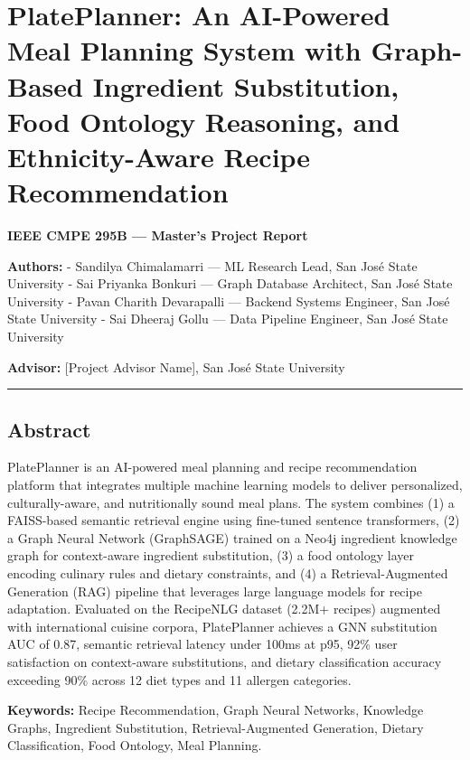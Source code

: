 \documentclass[
  10pt,
]{article}
\author{}
\date{}
\begin{document}
\section{PlatePlanner: An AI-Powered Meal Planning System with
Graph-Based Ingredient Substitution, Food Ontology Reasoning, and
Ethnicity-Aware Recipe
Recommendation}\label{plateplanner-an-ai-powered-meal-planning-system-with-graph-based-ingredient-substitution-food-ontology-reasoning-and-ethnicity-aware-recipe-recommendation}

\textbf{IEEE CMPE 295B --- Master's Project Report}

\textbf{Authors:} - Sandilya Chimalamarri --- ML Research Lead, San José
State University - Sai Priyanka Bonkuri --- Graph Database Architect,
San José State University - Pavan Charith Devarapalli --- Backend
Systems Engineer, San José State University - Sai Dheeraj Gollu --- Data
Pipeline Engineer, San José State University

\textbf{Advisor:} {[}Project Advisor Name{]}, San José State University

\begin{center}\rule{0.5\linewidth}{0.5pt}\end{center}

\subsection{Abstract}\label{abstract}

PlatePlanner is an AI-powered meal planning and recipe recommendation
platform that integrates multiple machine learning models to deliver
personalized, culturally-aware, and nutritionally sound meal plans. The
system combines (1) a FAISS-based semantic retrieval engine using
fine-tuned sentence transformers, (2) a Graph Neural Network (GraphSAGE)
trained on a Neo4j ingredient knowledge graph for context-aware
ingredient substitution, (3) a food ontology layer encoding culinary
rules and dietary constraints, and (4) a Retrieval-Augmented Generation
(RAG) pipeline that leverages large language models for recipe
adaptation. Evaluated on the RecipeNLG dataset (2.2M+ recipes) augmented
with international cuisine corpora, PlatePlanner achieves a GNN
substitution AUC of 0.87, semantic retrieval latency under 100ms at p95,
92\% user satisfaction on context-aware substitutions, and dietary
classification accuracy exceeding 90\% across 12 diet types and 11
allergen categories.

\textbf{Keywords:} Recipe Recommendation, Graph Neural Networks,
Knowledge Graphs, Ingredient Substitution, Retrieval-Augmented
Generation, Dietary Classification, Food Ontology, Meal Planning.
\end{document}
